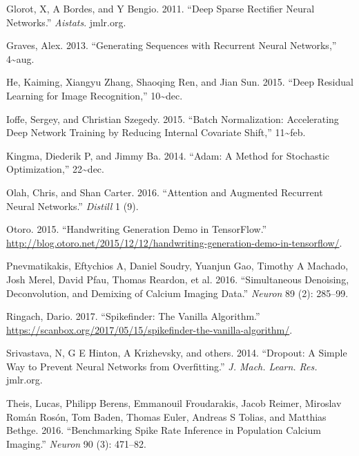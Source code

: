 \documentclass[]{article}
\begin{document}
\hypertarget{ref-Glorot2011-bj}{}
Glorot, X, A Bordes, and Y Bengio. 2011. ``Deep Sparse Rectifier Neural
Networks.'' \emph{Aistats}. jmlr.org.

\hypertarget{ref-Graves2013-tf}{}
Graves, Alex. 2013. ``Generating Sequences with Recurrent Neural
Networks,'' 4\textasciitilde{}aug.

\hypertarget{ref-He2015-hu}{}
He, Kaiming, Xiangyu Zhang, Shaoqing Ren, and Jian Sun. 2015. ``Deep
Residual Learning for Image Recognition,'' 10\textasciitilde{}dec.

\hypertarget{ref-Ioffe2015-gy}{}
Ioffe, Sergey, and Christian Szegedy. 2015. ``Batch Normalization:
Accelerating Deep Network Training by Reducing Internal Covariate
Shift,'' 11\textasciitilde{}feb.

\hypertarget{ref-Kingma2014-if}{}
Kingma, Diederik P, and Jimmy Ba. 2014. ``Adam: A Method for Stochastic
Optimization,'' 22\textasciitilde{}dec.

\hypertarget{ref-Olah2016-be}{}
Olah, Chris, and Shan Carter. 2016. ``Attention and Augmented Recurrent
Neural Networks.'' \emph{Distill} 1 (9).

\hypertarget{ref-Otoro2015-db}{}
Otoro. 2015. ``Handwriting Generation Demo in TensorFlow.''
\url{http://blog.otoro.net/2015/12/12/handwriting-generation-demo-in-tensorflow/}.

\hypertarget{ref-Pnevmatikakis2016-rp}{}
Pnevmatikakis, Eftychios A, Daniel Soudry, Yuanjun Gao, Timothy A
Machado, Josh Merel, David Pfau, Thomas Reardon, et al. 2016.
``Simultaneous Denoising, Deconvolution, and Demixing of Calcium Imaging
Data.'' \emph{Neuron} 89 (2): 285--99.

\hypertarget{ref-Ringach2017-bb}{}
Ringach, Dario. 2017. ``Spikefinder: The Vanilla Algorithm.''
\url{https://scanbox.org/2017/05/15/spikefinder-the-vanilla-algorithm/}.

\hypertarget{ref-Srivastava2014-dc}{}
Srivastava, N, G E Hinton, A Krizhevsky, and others. 2014. ``Dropout: A
Simple Way to Prevent Neural Networks from Overfitting.'' \emph{J. Mach.
Learn. Res.} jmlr.org.

\hypertarget{ref-Theis2016-sc}{}
Theis, Lucas, Philipp Berens, Emmanouil Froudarakis, Jacob Reimer,
Miroslav Román Rosón, Tom Baden, Thomas Euler, Andreas S Tolias, and
Matthias Bethge. 2016. ``Benchmarking Spike Rate Inference in Population
Calcium Imaging.'' \emph{Neuron} 90 (3): 471--82.
\end{document}
